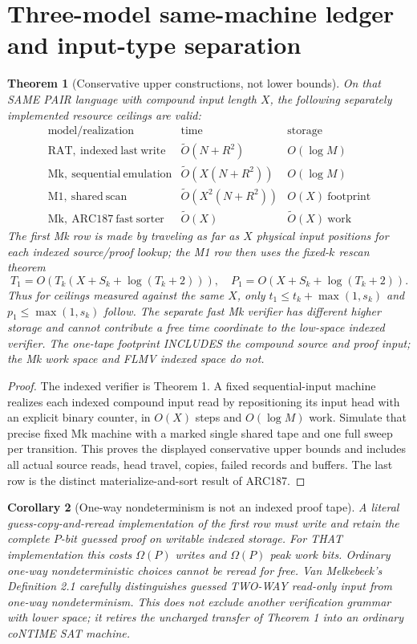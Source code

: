 \documentclass[11pt]{article}
\newtheorem{theorem}{Theorem}
\newtheorem{corollary}[theorem]{Corollary}
\begin{document}
\section{Three-model same-machine ledger and input-type separation}
\begin{theorem}[Conservative upper constructions, not lower bounds]
On that SAME PAIR language with compound input length $X$,
the following separately implemented resource ceilings are valid:
\[
\begin{array}{c|c|c}
\text{model/realization}&\text{time}&\text{storage}\\\hline
\mathrm{RAT,\ indexed\ last\ write}&\widetilde O(N+R^2)&O(\log M)\\
\mathrm{Mk,\ sequential\ emulation}&\widetilde O(X(N+R^2))&O(\log M)\\
\mathrm{M1,\ shared\ scan}&\widetilde O(X^2(N+R^2))&O(X)\ \text{footprint}\\
\mathrm{Mk,\ ARC187\ fast\ sorter}&\widetilde O(X)&\widetilde O(X)\ \text{work}
\end{array}
\]
The first Mk row is made by traveling as far as $X$ physical input
positions for each indexed source/proof lookup; the M1 row then uses
the fixed-$k$ rescan theorem
\[
 T_1=O(T_k(X+S_k+\log(T_k+2))),\quad
 P_1=O(X+S_k+\log(T_k+2)).
\]
Thus for ceilings measured against the same $X$, only
$t_1\le t_k+\max(1,s_k)$ and $p_1\le\max(1,s_k)$ follow.
The separate fast Mk verifier has different higher storage and cannot
contribute a free time coordinate to the low-space indexed verifier.
The one-tape footprint INCLUDES the compound source and proof input;
the Mk work space and FLMV indexed space do not.
\end{theorem}
\begin{proof}
The indexed verifier is Theorem 1. A fixed sequential-input machine
realizes each indexed compound input read by repositioning its input
head with an explicit binary counter, in $O(X)$ steps and $O(\log M)$
work. Simulate that precise fixed Mk machine with a marked single
shared tape and one full sweep per transition. This proves the
displayed conservative upper bounds and includes all actual source
reads, head travel, copies, failed records and buffers. The last
row is the distinct materialize-and-sort result of ARC187.
\end{proof}

\begin{corollary}[One-way nondeterminism is not an indexed proof tape]
A literal guess-copy-and-reread implementation of the first row must
write and retain the complete $P$-bit guessed proof on writable indexed
storage. For THAT implementation this costs $\Omega(P)$ writes and
$\Omega(P)$ peak work bits. Ordinary one-way nondeterministic choices
cannot be reread for free. Van Melkebeek's Definition 2.1 carefully
distinguishes guessed TWO-WAY read-only input from one-way nondeterminism.
This does not exclude another verification grammar with lower space;
it retires the uncharged transfer of Theorem 1 into an ordinary
coNTIME SAT machine.
\end{corollary}
\end{document}
